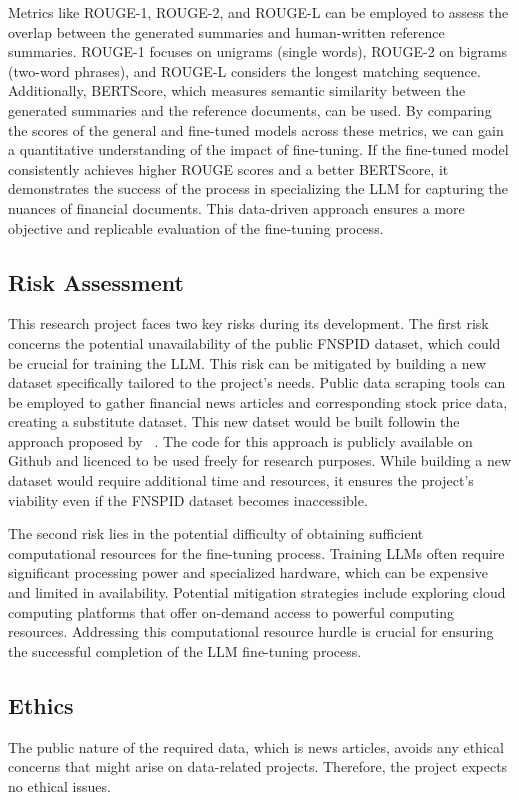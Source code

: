 Metrics like ROUGE-1, ROUGE-2, and ROUGE-L can be employed to assess the overlap between the generated summaries and
human-written reference summaries.
ROUGE-1 focuses on unigrams (single words), ROUGE-2 on bigrams (two-word phrases), and ROUGE-L considers the longest
matching sequence.
Additionally, BERTScore, which measures semantic similarity between the generated summaries and the reference documents,
can be used.
By comparing the scores of the general and fine-tuned models across these metrics, we can gain a quantitative
understanding of the impact of fine-tuning.
If the fine-tuned model consistently achieves higher ROUGE scores and a better BERTScore, it demonstrates the success of
the process in specializing the LLM for capturing the nuances of financial documents.
This data-driven approach ensures a more objective and replicable evaluation of the fine-tuning process.


\subsection{Risk Assessment}\label{subsec:risk-assessment}
This research project faces two key risks during its development.
The first risk concerns the potential unavailability of the public FNSPID dataset, which could be crucial for training
the LLM.  This risk can be mitigated by building a new dataset specifically tailored to the project's needs.
Public data scraping tools can be employed to gather financial news articles and corresponding stock price data,
creating a substitute dataset.
This new datset would be built followin the approach proposed by ~\cite{Dong2024}.
The code for this approach is publicly available on Github and licenced to be used freely for research purposes.
While building a new dataset would require additional time and resources, it ensures the project's viability even if
the FNSPID dataset becomes inaccessible.

The second risk lies in the potential difficulty of obtaining sufficient computational resources for the fine-tuning
process.
Training LLMs often require significant processing power and specialized hardware, which can be expensive and limited in
availability.
Potential mitigation strategies include exploring cloud computing platforms that offer on-demand access to powerful
computing resources.
Addressing this computational resource hurdle is crucial for ensuring the successful completion of the LLM fine-tuning
process.


\subsection{Ethics}\label{subsec:ethics}
The public nature of the required data, which is news articles, avoids any ethical concerns that might arise on
data-related projects.
Therefore, the project expects no ethical issues.

